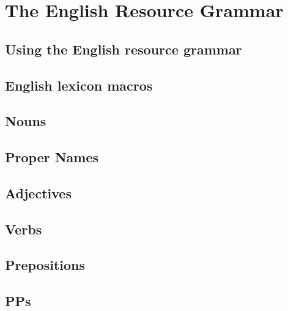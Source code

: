\chapter{The English Resource Grammar}
\label{Chapter:EnglishResourceGrammar}

\author{Manny Rayner}

\section{Using the English resource grammar}
\label{Section:EnglishResourceGrammarOverview}

\section{English lexicon macros}
\label{Section:EnglishLexiconMacros}

\section{Nouns}
\label{Section:EnglishNouns}

\section{Proper Names}
\label{Section:EnglishProperNames}

\section{Adjectives}
\label{Section:EnglishAdjectives}

\section{Verbs}
\label{Section:EnglishVerbs}

\section{Prepositions}
\label{Section:EnglishPrepositions}

\section{PPs}
\label{Section:EnglishPPs}
